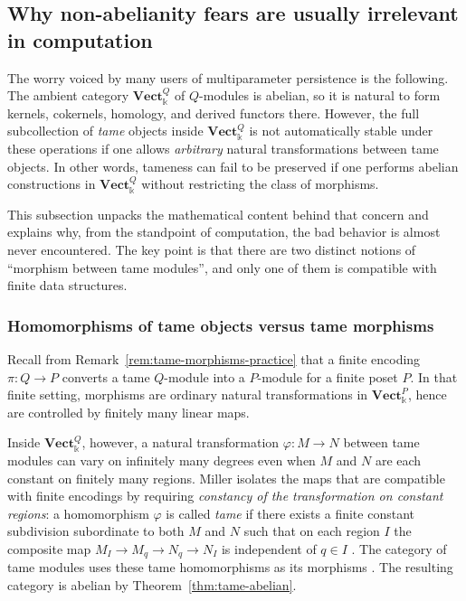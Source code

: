 \documentclass{article}
\newcommand{\kk}{\Bbbk}
\newcommand{\<}{\langle}
\renewcommand{\>}{\rangle}
\theoremstyle{definition}
\theoremstyle{remark}
\begin{document}
	\subsection{Why non-abelianity fears are usually irrelevant in computation}
	\label{subsec:tame-nonabelianity-practice}

	The worry voiced by many users of multiparameter persistence is the following.
	The ambient category $\mathbf{Vect}_{\kk}^{Q}$ of $Q$-modules is abelian, so it is natural
	to form kernels, cokernels, homology, and derived functors there.
	However, the full subcollection of \emph{tame} objects inside $\mathbf{Vect}_{\kk}^{Q}$ is
	not automatically stable under these operations if one allows \emph{arbitrary} natural
	transformations between tame objects.  In other words, tameness can fail to be preserved
	if one performs abelian constructions in $\mathbf{Vect}_{\kk}^{Q}$ without restricting the
	class of morphisms.

	This subsection unpacks the mathematical content behind that concern and explains why,
	from the standpoint of computation, the bad behavior is almost never encountered.
	The key point is that there are two distinct notions of ``morphism between tame modules'',
	and only one of them is compatible with finite data structures.

	\subsubsection*{Homomorphisms of tame objects versus tame morphisms}

	Recall from Remark~\ref{rem:tame-morphisms-practice} that a finite encoding
	$\pi\colon Q\to P$ converts a tame $Q$-module into a $P$-module for a finite poset $P$.
	In that finite setting, morphisms are ordinary natural transformations in
	$\mathbf{Vect}_{\kk}^{P}$, hence are controlled by finitely many linear maps.

	Inside $\mathbf{Vect}_{\kk}^{Q}$, however, a natural transformation
	$\varphi\colon M\to N$ between tame modules can vary on infinitely many degrees even when
	$M$ and $N$ are each constant on finitely many regions.  Miller isolates the maps that
	are compatible with finite encodings by requiring \emph{constancy of the transformation
	on constant regions}:
	a homomorphism $\varphi$ is called \emph{tame} if there exists a finite constant subdivision
	subordinate to both $M$ and $N$ such that on each region $I$ the composite map
	$M_I\to M_q\to N_q\to N_I$ is independent of $q\in I$ \cite[Def.~4.27]{Mil20}.
	The category of tame modules uses these tame homomorphisms as its morphisms
	\cite[Def.~4.29 and Rem.~4.30]{Mil20}.  The resulting category is abelian by
	Theorem~\ref{thm:tame-abelian}.
\end{document}
